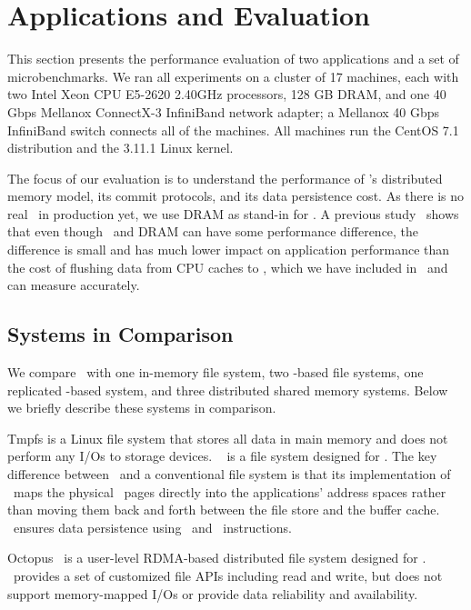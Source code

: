 \section{Applications and Evaluation}
\label{sec:hotpot:app}

This section presents the performance evaluation of two applications and a set of microbenchmarks.
We ran all experiments on a cluster of 17 machines, each with two Intel Xeon CPU E5-2620 2.40GHz
processors, 128 GB DRAM, and one 40 Gbps Mellanox ConnectX-3 InfiniBand network adapter;
a Mellanox 40 Gbps InfiniBand switch connects all of the machines. 
All machines run the CentOS 7.1 distribution and the 3.11.1 Linux kernel.

The focus of our evaluation is to understand the performance of \dsnvm's distributed memory model,
its commit protocols, and its data persistence cost. As there is no real \nvm\ in production yet,
we use DRAM as stand-in for \nvm. A previous study~\cite{Zhang15-NVMMStudy} shows that even though
\nvm\ and DRAM can have some performance difference, the difference is small and has much lower impact
on application performance than the cost of flushing data from CPU caches to \nvm, which we have
included in \hotpot\ and can measure accurately.

\subsection{Systems in Comparison}
\label{sec:hotpot:comparesys}
We compare \hotpot\ with one in-memory file system, two \nvm-based file systems, 
one replicated \nvm-based system, and three distributed shared memory systems.
Below we briefly describe these systems in comparison.

Tmpfs is a Linux file system that stores all data in main memory and does not perform any I/Os to storage devices.
\pmfs~\cite{Dulloor14-EuroSys} is a file system designed for \nvm. 
The key difference between \pmfs\ and a conventional file system is that its implementation of
\mmap\ maps the physical \nvm\ pages directly into the applications' address spaces rather than moving them back and
forth between the file store and the buffer cache.
\pmfs\ ensures data persistence using \sfence\ and \clflush\ instructions.

Octopus~\cite{Octopus} is a user-level RDMA-based distributed file system designed for \nvm.
\Octopus\ provides a set of customized file APIs including read and write,
but does not support memory-mapped I/Os or provide data reliability and availability.

